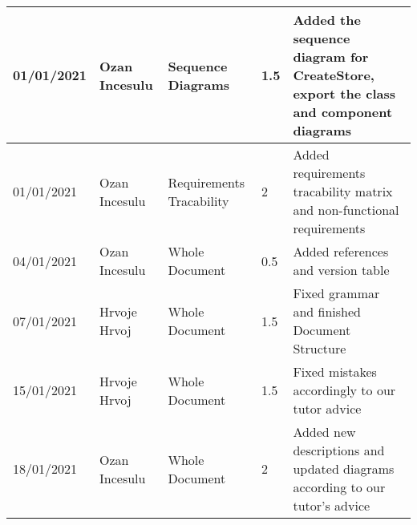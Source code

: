 \newpage
\begin{table}[H]
    \begin{tabular}{|p{2cm}|p{2cm}|p{2.5cm}|p{1.5cm}|p{7.5cm}|}
        \hline

        01/01/2021 & Ozan Incesulu & Sequence Diagrams & 1.5              & Added the sequence diagram for CreateStore, export the class and component diagrams \\ \hline
        01/01/2021 & Ozan Incesulu & Requirements Tracability & 2 & Added requirements tracability matrix and non-functional requirements \\ \hline
        04/01/2021 & Ozan Incesulu & Whole Document & 0.5 & Added references and version table \\ \hline
        07/01/2021 & Hrvoje Hrvoj  & Whole Document & 1.5 & Fixed grammar and finished Document Structure \\ \hline
        15/01/2021 & Hrvoje Hrvoj  & Whole Document & 1.5 & Fixed mistakes accordingly to our tutor advice \\ \hline
        18/01/2021 & Ozan Incesulu & Whole Document & 2 & Added new descriptions and updated diagrams according to our tutor's advice \\ \hline
    \end{tabular}
\end{table}
